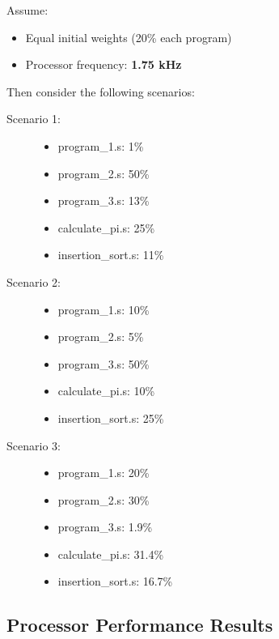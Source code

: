 \documentclass[a4paper,12pt]{article}
\begin{document}
Assume:
\begin{itemize}
    \item Equal initial weights (20\% each program)
    \item Processor frequency: \textbf{1.75 kHz}
\end{itemize}

Then consider the following scenarios:

\begin{description}
    \item[Scenario 1:] 
    \begin{itemize}
        \item program\_1.s: 1\%
        \item program\_2.s: 50\%
        \item program\_3.s: 13\%
        \item calculate\_pi.s: 25\%
        \item insertion\_sort.s: 11\%
    \end{itemize}

    \item[Scenario 2:] 
    \begin{itemize}
        \item program\_1.s: 10\%
        \item program\_2.s: 5\%
        \item program\_3.s: 50\%
        \item calculate\_pi.s: 10\%
        \item insertion\_sort.s: 25\%
    \end{itemize}

    \item[Scenario 3:] 
    \begin{itemize}
        \item program\_1.s: 20\%
        \item program\_2.s: 30\%
        \item program\_3.s: 1.9\%
        \item calculate\_pi.s: 31.4\%
        \item insertion\_sort.s: 16.7\%
    \end{itemize}
\end{description}

\subsection*{Processor Performance Results}
\end{document}
